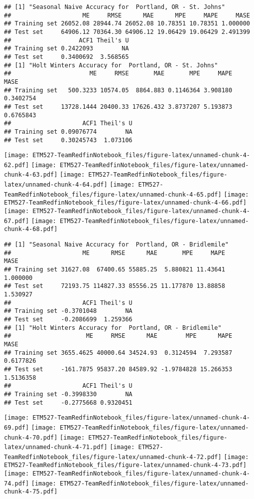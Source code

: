 \documentclass[]{article}
\begin{document}
\begin{verbatim}
## [1] "Seasonal Naive Accuracy for  Portland, OR - St. Johns"
##                    ME     RMSE      MAE      MPE     MAPE     MASE
## Training set 26052.08 28944.74 26052.08 10.78351 10.78351 1.000000
## Test set     64906.12 70364.30 64906.12 19.06429 19.06429 2.491399
##                   ACF1 Theil's U
## Training set 0.2422093        NA
## Test set     0.3400692  3.568565
## [1] "Holt Winters Accuracy for  Portland, OR - St. Johns"
##                      ME     RMSE       MAE       MPE     MAPE      MASE
## Training set   500.3233 10574.05  8864.883 0.1146364 3.908180 0.3402754
## Test set     13728.1444 20400.33 17626.432 3.8737207 5.193873 0.6765843
##                    ACF1 Theil's U
## Training set 0.09076774        NA
## Test set     0.30245743  1.073106
\end{verbatim}

\texttt{[image: ETM527-TeamRedfinNotebook\_files/figure-latex/unnamed-chunk-4-62.pdf]}
\texttt{[image: ETM527-TeamRedfinNotebook\_files/figure-latex/unnamed-chunk-4-63.pdf]}
\texttt{[image: ETM527-TeamRedfinNotebook\_files/figure-latex/unnamed-chunk-4-64.pdf]}
\texttt{[image: ETM527-TeamRedfinNotebook\_files/figure-latex/unnamed-chunk-4-65.pdf]}
\texttt{[image: ETM527-TeamRedfinNotebook\_files/figure-latex/unnamed-chunk-4-66.pdf]}
\texttt{[image: ETM527-TeamRedfinNotebook\_files/figure-latex/unnamed-chunk-4-67.pdf]}
\texttt{[image: ETM527-TeamRedfinNotebook\_files/figure-latex/unnamed-chunk-4-68.pdf]}

\begin{verbatim}
## [1] "Seasonal Naive Accuracy for  Portland, OR - Bridlemile"
##                    ME      RMSE      MAE       MPE     MAPE     MASE
## Training set 31627.08  67400.65 55885.25  5.880821 11.43641 1.000000
## Test set     72193.75 114827.33 85556.25 11.177870 13.88858 1.530927
##                    ACF1 Theil's U
## Training set -0.3701048        NA
## Test set     -0.2086699  1.259366
## [1] "Holt Winters Accuracy for  Portland, OR - Bridlemile"
##                     ME     RMSE      MAE        MPE      MAPE      MASE
## Training set 3655.4625 40000.64 34524.93  0.3124594  7.293587 0.6177826
## Test set     -161.7875 95837.20 84589.92 -1.9784828 15.266353 1.5136358
##                    ACF1 Theil's U
## Training set -0.3998330        NA
## Test set     -0.2775668 0.9320451
\end{verbatim}

\texttt{[image: ETM527-TeamRedfinNotebook\_files/figure-latex/unnamed-chunk-4-69.pdf]}
\texttt{[image: ETM527-TeamRedfinNotebook\_files/figure-latex/unnamed-chunk-4-70.pdf]}
\texttt{[image: ETM527-TeamRedfinNotebook\_files/figure-latex/unnamed-chunk-4-71.pdf]}
\texttt{[image: ETM527-TeamRedfinNotebook\_files/figure-latex/unnamed-chunk-4-72.pdf]}
\texttt{[image: ETM527-TeamRedfinNotebook\_files/figure-latex/unnamed-chunk-4-73.pdf]}
\texttt{[image: ETM527-TeamRedfinNotebook\_files/figure-latex/unnamed-chunk-4-74.pdf]}
\texttt{[image: ETM527-TeamRedfinNotebook\_files/figure-latex/unnamed-chunk-4-75.pdf]}
\end{document}
